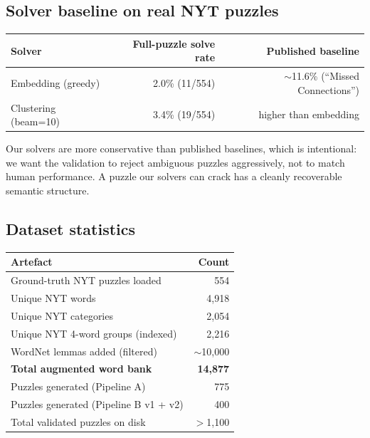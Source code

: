 \documentclass[11pt, letterpaper]{article}
\begin{document}
\subsection{Solver baseline on real NYT puzzles}
\begin{center}
\small
\begin{tabular}{l r r}
\toprule
\textbf{Solver} & \textbf{Full-puzzle solve rate} & \textbf{Published baseline} \\
\midrule
Embedding (greedy)   & 2.0\% (11/554) & $\sim$11.6\% (``Missed Connections'') \\
Clustering (beam=10) & 3.4\% (19/554) & higher than embedding \\
\bottomrule
\end{tabular}
\end{center}

Our solvers are more conservative than published baselines, which is intentional:
we want the validation to reject ambiguous puzzles aggressively, not to match
human performance. A puzzle our solvers can crack has a cleanly recoverable
semantic structure.

\subsection{Dataset statistics}
\begin{center}
\small
\begin{tabular}{l r}
\toprule
\textbf{Artefact} & \textbf{Count} \\
\midrule
Ground-truth NYT puzzles loaded            & 554 \\
Unique NYT words                           & 4{,}918 \\
Unique NYT categories                      & 2{,}054 \\
Unique NYT 4-word groups (indexed)         & 2{,}216 \\
WordNet lemmas added (filtered)            & $\sim$10{,}000 \\
\textbf{Total augmented word bank}         & \textbf{14{,}877} \\
Puzzles generated (Pipeline A)             & 775 \\
Puzzles generated (Pipeline B v1 + v2)     & 400 \\
Total validated puzzles on disk            & $>$1{,}100 \\
\bottomrule
\end{tabular}
\end{center}
\end{document}
